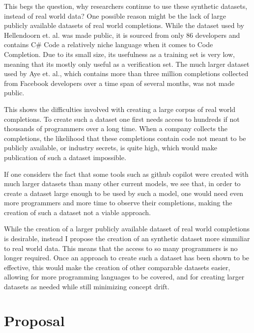 \documentclass[sigplan,screen,9pt]{acmart}
\begin{document}
This begs the question, why researchers continue to use these synthetic datasets, instead of real world data?
One possible reason might be the lack of large publicly available datasets of real world completions.
While the dataset used by Hellendoorn et. al.\cite{8812116} was made public, it is sourced from only 86 developers and contains C\# Code a relatively niche language when it comes to Code Completion.
Due to its small size, its usefulness as a training set is very low, meaning that its mostly only useful as a verification set.
The much larger dataset used by Aye et. al.\cite{https://doi.org/10.48550/arxiv.2011.04542}, which contains more than three million completions collected from Facebook developers over a time span of several months, was not made public.

This shows the difficulties involved with creating a large corpus of real world completions.
To create such a dataset one first needs access to hundreds if not thousands of programmers over a long time. When a company collects the completions, the likelihood that these completions contain code not meant to be publicly available, or industry secrets, is quite high, which would make publication of such a dataset impossible.

If one considers the fact that some tools such as github copilot were created with much larger datasets than many other current models\cite{2107.03374}, we see that, in order to create a dataset large enough to be used by such a model, one would need even more programmers and more time to observe their completions, making the creation of such a dataset not a viable approach.

While the creation of a larger publicly available dataset of real world completions is desirable, instead I propose the creation of an synthetic dataset more simmiliar to real world data.
This means that the access to so many programmers is no longer required. Once an approach to create such a dataset has been shown to be effective, this would make the creation of other comparable datasets easier, allowing for more programming languages to be covered, and for creating larger datasets as needed while still minimizing concept drift.


\section{Proposal}
\end{document}
